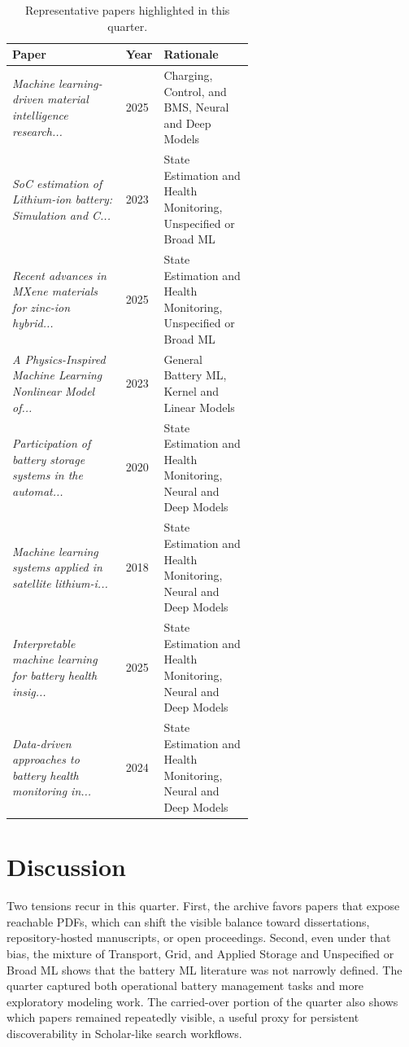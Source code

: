 \documentclass[conference]{IEEEtran}
\begin{document}
\begin{table}[t]
\caption{Representative papers highlighted in this quarter.}
\label{tab:notable}
\centering
\footnotesize
\begin{tabularx}{\linewidth}{p{0.47\linewidth} p{0.12\linewidth} X}
\toprule
Paper & Year & Rationale \\
\midrule
\textit{Machine learning-driven material intelligence research...} \cite{machinelearningdriven2025} & 2025 & Charging, Control, and BMS, Neural and Deep Models \\
\textit{SoC estimation of Lithium-ion battery: Simulation and C...} \cite{socestimationof2023} & 2023 & State Estimation and Health Monitoring, Unspecified or Broad ML \\
\textit{Recent advances in MXene materials for zinc-ion hybrid...} \cite{recentadvancesin2025} & 2025 & State Estimation and Health Monitoring, Unspecified or Broad ML \\
\textit{A Physics-Inspired Machine Learning Nonlinear Model of...} \cite{aphysicsinspired2023} & 2023 & General Battery ML, Kernel and Linear Models \\
\textit{Participation of battery storage systems in the automat...} \cite{participationofbattery2020} & 2020 & State Estimation and Health Monitoring, Neural and Deep Models \\
\textit{Machine learning systems applied in satellite lithium-i...} \cite{machinelearningsystems2018} & 2018 & State Estimation and Health Monitoring, Neural and Deep Models \\
\textit{Interpretable machine learning for battery health insig...} \cite{interpretablemachinelear2025} & 2025 & State Estimation and Health Monitoring, Neural and Deep Models \\
\textit{Data-driven approaches to battery health monitoring in...} \cite{datadrivenapproaches2024} & 2024 & State Estimation and Health Monitoring, Neural and Deep Models \\
\bottomrule
\end{tabularx}
\end{table}

\section{Discussion}
Two tensions recur in this quarter. First, the archive favors papers that expose reachable PDFs, which can shift the visible balance toward dissertations, repository-hosted manuscripts, or open proceedings. Second, even under that bias, the mixture of Transport, Grid, and Applied Storage and Unspecified or Broad ML shows that the battery ML literature was not narrowly defined. The quarter captured both operational battery management tasks and more exploratory modeling work. The carried-over portion of the quarter also shows which papers remained repeatedly visible, a useful proxy for persistent discoverability in Scholar-like search workflows.
\end{document}
